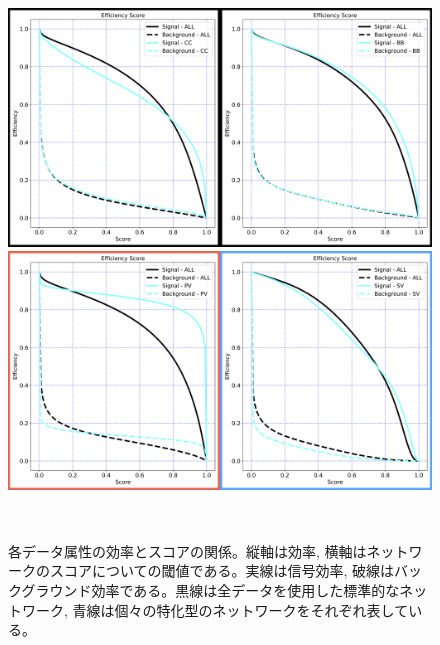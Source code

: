\begin{figure}[htbp]
 \centering
  \begin{minipage}{1.0\textwidth}
   \centering
    \includegraphics[width=1.0\textwidth, clip]{Figure/3Networks/3-4-3-2EfficiencyCurve_1.png}
   \end{minipage}
   
   \begin{minipage}{1.0\textwidth}
   \centering
    \includegraphics[width=1.0\textwidth, clip]{Figure/3Networks/3-4-3-2EfficiencyCurve_2.png}
   \end{minipage}
  \caption[各データ属性の効率とスコアの関係]{各データ属性の効率とスコアの関係。縦軸は効率, 横軸はネットワークのスコアについての閾値である。実線は信号効率, 破線はバックグラウンド効率である。黒線は全データを使用した標準的なネットワーク, 青線は個々の特化型のネットワークをそれぞれ表している。}
  \label{3-4-3-2EfficiencyCurve}
\end{figure}

